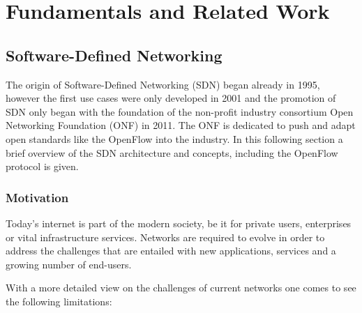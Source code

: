\chapter{Fundamentals and Related Work}

\section{Software-Defined Networking}
The origin of Software-Defined Networking (SDN) began already in 1995, however the first use cases were only developed in 2001 and the promotion of SDN only began with the foundation of the non-profit industry consortium Open Networking Foundation (ONF) in 2011. \cite{roadtosdn}
The ONF is dedicated to push and adapt open standards like the OpenFlow into the industry.
In this following section a brief overview of the SDN architecture and concepts, including the OpenFlow protocol is given.

\subsection{Motivation}

Today's internet is part of the modern society, be it for private users, enterprises or vital infrastructure services. Networks are required to evolve in order to address the challenges that are entailed with new applications, services and a growing number of end-users.

With a more detailed view on the challenges of current networks one comes to see the following limitations: \cite{onfnewnorm}


